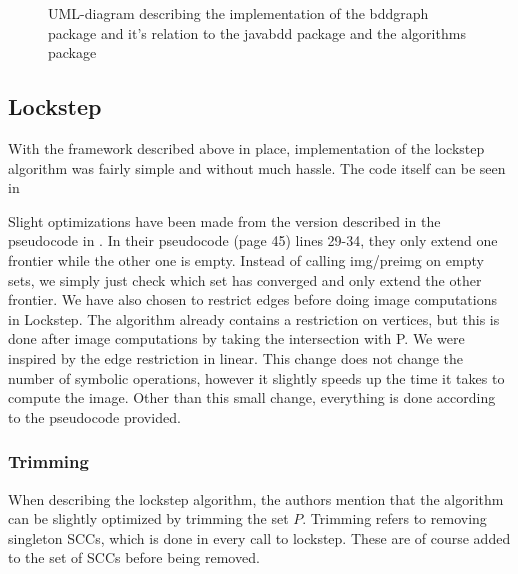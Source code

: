\documentclass[../master/master.tex]{subfiles}
\begin{document}
\begin{figure}[H]
\begin{center}
\end{center}
\caption{UML-diagram describing the implementation of the bddgraph package and it's relation to the javabdd package and the algorithms package}
\label{main_uml}
\end{figure}

\subsection{Lockstep}
With the framework described above in place, implementation of the lockstep algorithm was fairly simple and without much hassle. The code itself can be seen in 

Slight optimizations have been made from the version described in the pseudocode in \cite{lockstep}. In their pseudocode (page 45) lines 29-34, they only extend one frontier while the other one is empty. Instead of calling img/preimg on empty sets, we simply just check which set has converged and only extend the other frontier. We have also chosen to restrict edges before doing image computations in Lockstep. The algorithm already contains a restriction on vertices, but this is done after image computations by taking the intersection with P. We were inspired by the edge restriction in linear. This change does not change the number of symbolic operations, however it slightly speeds up the time it takes to compute the image.
Other than this small change, everything is done according to the pseudocode provided. 
\subsubsection{Trimming}
When describing the lockstep algorithm\cite{lockstep}, the authors mention that the algorithm can be slightly optimized by trimming the set $P$. Trimming refers to removing singleton SCCs, which is done in every call to lockstep. These are of course added to the set of SCCs before being removed.
\end{document}
